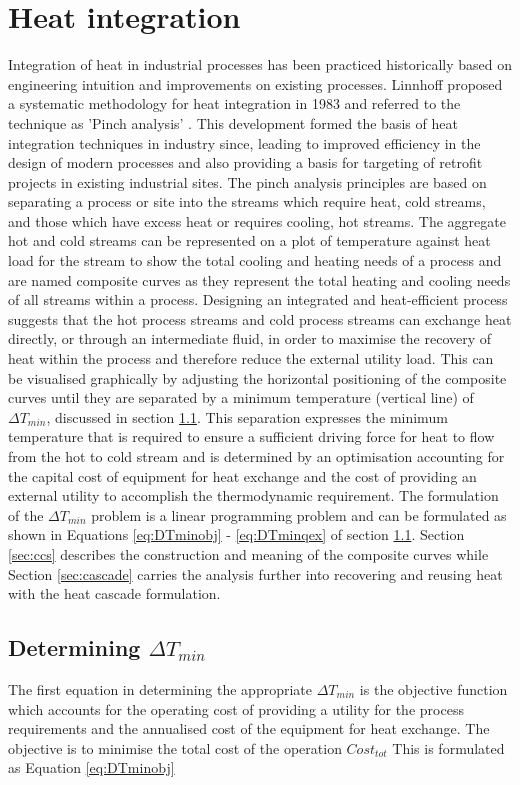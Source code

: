 
\section{Heat integration}\label{heat_integration}
Integration of heat in industrial processes has been practiced historically based on engineering intuition and improvements on existing processes. Linnhoff proposed a systematic methodology for heat integration in 1983 and referred to the technique as 'Pinch analysis' \cite{linnhoff_1983_pinch}. This development formed the basis of heat integration techniques in industry since, leading to improved efficiency in the design of modern processes and also providing a basis for targeting of retrofit projects in existing industrial sites. The pinch analysis principles are based on separating a process or site into the streams which require heat, cold streams, and those which have excess heat or requires cooling, hot streams. The aggregate hot and cold streams can be represented on a plot of temperature against heat load for the stream to show the total cooling and heating needs of a process and are named composite curves as they represent the total heating and cooling needs of all streams within a process. Designing an integrated and heat-efficient process suggests that the hot process streams and cold process streams can exchange heat directly, or through an intermediate fluid, in order to maximise the recovery of heat within the process and therefore reduce the external utility load. This can be visualised graphically by adjusting the horizontal positioning of the composite curves until they are separated by a minimum temperature (vertical line) of $\Delta T_{min}$, discussed in section \ref{sec:DTmin}. This separation expresses the minimum temperature that is required to ensure a sufficient driving force for heat to flow from the hot to cold stream and is determined by an optimisation accounting for the capital cost of equipment for heat exchange and the cost of providing an external utility to accomplish the thermodynamic requirement. The formulation of the $\Delta T_{min}$ problem is a linear programming problem and can be formulated as shown in Equations \ref{eq:DTminobj} - \ref{eq:DTminqex} of section \ref{sec:DTmin}. Section \ref{sec:ccs} describes the construction and meaning of the composite curves while Section \ref{sec:cascade} carries the analysis further into recovering and reusing heat with the heat cascade formulation.

\subsection{Determining $\Delta T_{min}$}\label{sec:DTmin}
The first equation in determining the appropriate $\Delta T_{min}$ is the objective function which accounts for the operating cost of providing a utility for the process requirements and the annualised cost of the equipment for heat exchange. The objective is to minimise the total cost of the operation $Cost_{tot}$ This is formulated as Equation \ref{eq:DTminobj}

